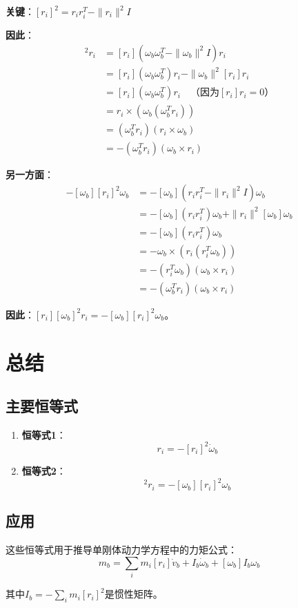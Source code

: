 \documentclass[12pt,a4paper]{article}
\begin{document}
\textbf{关键}：$[r_i]^2 = r_i r_i^T - \|r_i\|^2 I$

\textbf{因此}：
\begin{align}
[r_i][\omega_b]^2 r_i &= [r_i](\omega_b \omega_b^T - \|\omega_b\|^2 I) r_i \\
&= [r_i](\omega_b \omega_b^T) r_i - \|\omega_b\|^2 [r_i] r_i \\
&= [r_i](\omega_b \omega_b^T) r_i \quad \text{（因为$[r_i] r_i = 0$）} \\
&= r_i \times (\omega_b (\omega_b^T r_i)) \\
&= (\omega_b^T r_i)(r_i \times \omega_b) \\
&= -(\omega_b^T r_i)(\omega_b \times r_i)
\end{align}

\textbf{另一方面}：
\begin{align}
-[\omega_b][r_i]^2 \omega_b &= -[\omega_b](r_i r_i^T - \|r_i\|^2 I) \omega_b \\
&= -[\omega_b](r_i r_i^T) \omega_b + \|r_i\|^2 [\omega_b] \omega_b \\
&= -[\omega_b](r_i r_i^T) \omega_b \\
&= -\omega_b \times (r_i (r_i^T \omega_b)) \\
&= -(r_i^T \omega_b)(\omega_b \times r_i) \\
&= -(\omega_b^T r_i)(\omega_b \times r_i)
\end{align}

\textbf{因此}：$[r_i][\omega_b]^2 r_i = -[\omega_b][r_i]^2 \omega_b$。

\section{总结}

\subsection{主要恒等式}

\begin{enumerate}
\item \textbf{恒等式1}：
\begin{equation}
[r_i][\dot{\omega}_b] r_i = -[r_i]^2 \dot{\omega}_b
\end{equation}

\item \textbf{恒等式2}：
\begin{equation}
[r_i][\omega_b]^2 r_i = -[\omega_b][r_i]^2 \omega_b
\end{equation}
\end{enumerate}

\subsection{应用}

这些恒等式用于推导单刚体动力学方程中的力矩公式：
\begin{equation}
m_b = \sum_i m_i [r_i] \dot{v}_b + I_b \dot{\omega}_b + [\omega_b] I_b \omega_b
\end{equation}

其中$I_b = -\sum_i m_i [r_i]^2$是惯性矩阵。
\end{document}
